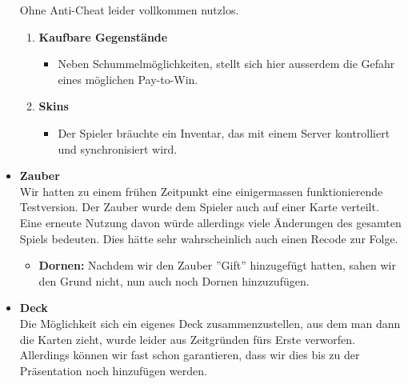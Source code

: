 \begin{itemize}
    Ohne Anti-Cheat leider vollkommen nutzlos.
    \begin{enumerate}
        \item \textbf{Kaufbare Gegenstände}
        \begin{itemize}
            \item Neben Schummelmöglichkeiten, stellt sich hier ausserdem die Gefahr eines möglichen Pay-to-Win.
        \end{itemize}
        \item \textbf{Skins}
        \begin{itemize}
            \item Der Spieler bräuchte ein Inventar, das mit einem Server kontrolliert und synchronisiert wird. 
        \end{itemize}
    \end{enumerate}
    \item \textbf{Zauber} \\
        Wir hatten zu einem frühen Zeitpunkt eine einigermassen funktionierende Testversion. Der Zauber wurde dem Spieler auch auf einer Karte verteilt. 
        Eine erneute Nutzung davon würde allerdings viele Änderungen des gesamten Spiels bedeuten. Dies hätte sehr wahrscheinlich auch einen Recode zur Folge.
    \begin{itemize}
        \item \textbf{Dornen:}
            Nachdem wir den Zauber ''Gift'' hinzugefügt hatten, sahen wir den Grund nicht, nun auch noch Dornen hinzuzufügen.
    \end{itemize}
    \item \textbf{Deck} \\
        Die Möglichkeit sich ein eigenes Deck zusammenzustellen, aus dem man dann die Karten zieht, wurde leider aus Zeitgründen fürs Erste verworfen. Allerdings können wir
        fast schon garantieren, dass wir dies bis zu der Präsentation noch hinzufügen werden.    
\end{itemize}
